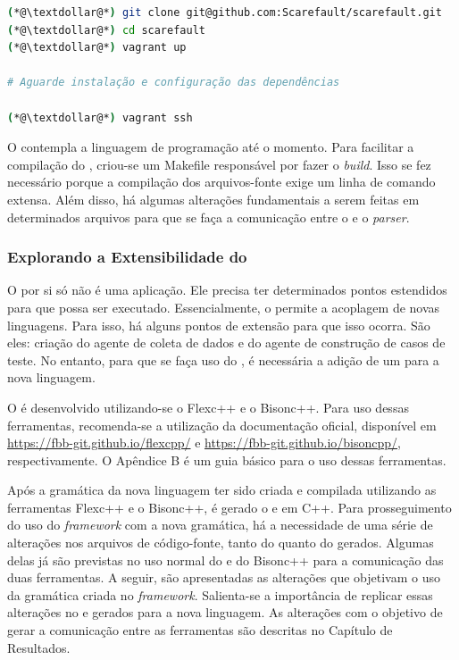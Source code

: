 \begin{lstlisting}[language=bash, label=ambiente-virtual, caption=Levantamento do ambiente de desenvolvimento]
(*@\textdollar@*) git clone git@github.com:Scarefault/scarefault.git
(*@\textdollar@*) cd scarefault
(*@\textdollar@*) vagrant up

# Aguarde instalação e configuração das dependências

(*@\textdollar@*) vagrant ssh
\end{lstlisting}

O \scarefault contempla a linguagem de programação \grails até o momento.
Para facilitar a compilação do \Scarefault, criou-se um \textsf{Makefile}
responsável por fazer o \textit{build}. Isso se fez necessário porque a
compilação dos arquivos-fonte exige um linha de comando extensa. Além disso,
há algumas alterações fundamentais a serem feitas em determinados arquivos
para que se faça a comunicação entre o \scanner e o \textit{parser}.

\subsubsection{Explorando a Extensibilidade do \Scarefault}
O \scarefault por si só não é uma aplicação. Ele precisa ter determinados pontos
estendidos para que possa ser executado. Essencialmente, o \scarefault permite a
acoplagem de novas linguagens. Para isso, há alguns pontos de extensão para que
isso ocorra. São eles: criação do agente de coleta de dados e do agente de
construção de casos de teste. No entanto, para que se faça uso do \scarefault, é
necessária a adição de um \parser para a nova linguagem.


O \parser é desenvolvido utilizando-se o \textsf{Flexc++} e o \textsf{Bisonc++}. Para
uso dessas ferramentas, recomenda-se a utilização da documentação oficial, disponível
em \url{https://fbb-git.github.io/flexcpp/} e \url{https://fbb-git.github.io/bisoncpp/},
respectivamente. O Apêndice B é um guia básico para o uso dessas ferramentas.

Após a gramática da nova linguagem ter sido criada e compilada utilizando as ferramentas \textsf{Flexc++} e o \textsf{Bisonc++}, é gerado o \parser e \scanner em C++. Para prosseguimento do uso do \textit{framework} com a nova gramática, há a necessidade de
uma série de alterações nos arquivos de código-fonte, tanto do \parser quanto do
\scanner gerados. Algumas delas já são previstas no uso normal do \flexcpp e do
\textsf{Bisonc++} para a comunicação das duas ferramentas. A seguir, são apresentadas as alterações que objetivam o uso da gramática criada no \textit{framework}. Salienta-se a importância de replicar essas alterações no \parser e \scanner gerados para a nova linguagem. As alterações com o
objetivo de gerar a comunicação entre as ferramentas são descritas no Capítulo de
Resultados.  

